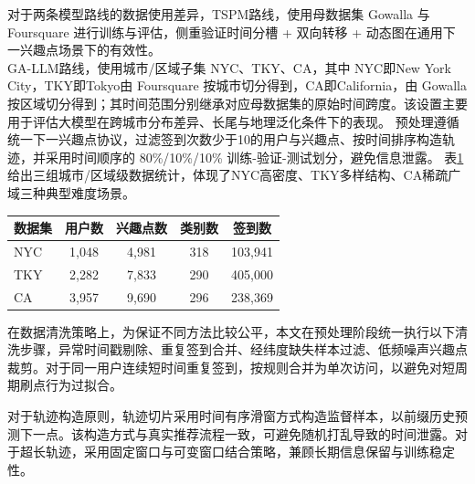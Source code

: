 对于两条模型路线的数据使用差异，{\heiti{}TSPM路线，}使用母数据集 Gowalla 与 Foursquare 进行训练与评估，侧重验证时间分槽 + 双向转移 + 动态图在通用下一兴趣点场景下的有效性。\\
{\heiti{}GA-LLM路线，}使用城市/区域子集 NYC、TKY、CA，其中 NYC即New York City，TKY即Tokyo由 Foursquare 按城市切分得到，CA即California，由 Gowalla 按区域切分得到；其时间范围分别继承对应母数据集的原始时间跨度\cite{LLM4POI}。该设置主要用于评估大模型在跨城市分布差异、长尾与地理泛化条件下的表现。
预处理遵循统一下一兴趣点协议，过滤签到次数少于10的用户与兴趣点、按时间排序构造轨迹，并采用时间顺序的 80\%/10\%/10\% 训练-验证-测试划分，避免信息泄露\cite{LLM4POI,GETNext,STHGCN}。
表\ref{tab:c4-datasets-icde}给出三组城市/区域级数据统计，体现了NYC高密度、TKY多样结构、CA稀疏广域三种典型难度场景。

\begin{table}[htbp]
    \tblstyle
    \label{tab:c4-datasets-icde}
    \begin{tabular}{lcccc}
        \toprule
        数据集 & 用户数 & 兴趣点数 & 类别数 & 签到数 \\
        \midrule
        NYC & 1,048 & 4,981 & 318 & 103,941 \\
        TKY & 2,282 & 7,833 & 290 & 405,000 \\
        CA & 3,957 & 9,690 & 296 & 238,369 \\
        \bottomrule
    \end{tabular}
\end{table}

在数据清洗策略上，为保证不同方法比较公平，本文在预处理阶段统一执行以下清洗步骤，异常时间戳剔除、重复签到合并、经纬度缺失样本过滤、低频噪声兴趣点裁剪。对于同一用户连续短时间重复签到，按规则合并为单次访问，以避免对短周期刷点行为过拟合。

对于轨迹构造原则，轨迹切片采用时间有序滑窗方式构造监督样本，以前缀历史预测下一点。该构造方式与真实推荐流程一致，可避免随机打乱导致的时间泄露。对于超长轨迹，采用固定窗口与可变窗口结合策略，兼顾长期信息保留与训练稳定性。

